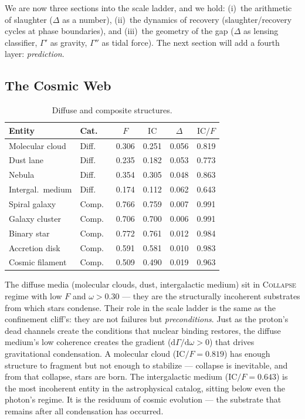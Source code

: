\documentclass[
  aps,
  prd,
  twocolumn,
  superscriptaddress,
  nofootinbib,
  floatfix
]{revtex4-2}
\newcommand{\Gam}{\Gamma}
\newcommand{\dd}{\mathrm{d}}
\newcommand{\regime}[1]{\textsc{#1}}
\newcommand{\IC}{\mathrm{IC}}
\begin{document}
We are now three sections into the scale ladder, and we hold:
(i)~the arithmetic of slaughter ($\Delta$ as a number),
(ii)~the dynamics of recovery (slaughter/recovery cycles at
phase boundaries), and (iii)~the geometry of the gap ($\Delta$
as lensing classifier, $\Gam'$ as gravity, $\Gam''$ as tidal
force).  The next section will add a fourth layer:
\emph{prediction}.


\subsection{The Cosmic Web}

\begin{table}[t]
\caption{\label{tab:cosmic}Diffuse and composite structures.}
\begin{ruledtabular}
\begin{tabular}{llcccc}
Entity & Cat.\ & $F$ & $\IC$ & $\Delta$ & $\IC/F$ \\
\hline
Molecular cloud    & Diff.\ & 0.306 & 0.251 & 0.056 & 0.819 \\
Dust lane          & Diff.\ & 0.235 & 0.182 & 0.053 & 0.773 \\
Nebula             & Diff.\ & 0.354 & 0.305 & 0.048 & 0.863 \\
Intergal.\ medium  & Diff.\ & 0.174 & 0.112 & 0.062 & 0.643 \\
\hline
Spiral galaxy      & Comp.\ & 0.766 & 0.759 & 0.007 & 0.991 \\
Galaxy cluster     & Comp.\ & 0.706 & 0.700 & 0.006 & 0.991 \\
Binary star        & Comp.\ & 0.772 & 0.761 & 0.012 & 0.984 \\
Accretion disk     & Comp.\ & 0.591 & 0.581 & 0.010 & 0.983 \\
Cosmic filament    & Comp.\ & 0.509 & 0.490 & 0.019 & 0.963 \\
\end{tabular}
\end{ruledtabular}
\end{table}

The diffuse media (molecular clouds, dust, intergalactic
medium) sit in \regime{Collapse} regime with low $F$ and
$\omega > 0.30$ --- they are the structurally incoherent
substrates from which stars condense.  Their role in the
scale ladder is the same as the confinement cliff's: they
are not failures but \emph{preconditions}.  Just as the
proton's dead channels create the conditions that nuclear
binding restores, the diffuse medium's low coherence creates
the gradient ($\dd\Gam/\dd\omega > 0$) that drives
gravitational condensation.  A molecular cloud
($\IC/F = 0.819$) has enough structure to fragment but not
enough to stabilize --- collapse is inevitable, and from that
collapse, stars are born.  The intergalactic medium
($\IC/F = 0.643$) is the most incoherent entity in the
astrophysical catalog, sitting below even the photon's regime.
It is the residuum of cosmic evolution --- the substrate that
remains after all condensation has occurred.
\end{document}
